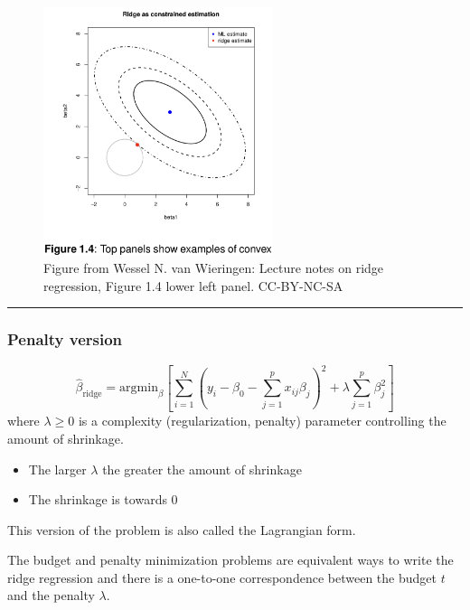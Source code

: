 \documentclass[
  letterpaper,
  DIV=11,
  numbers=noendperiod]{scrartcl}
\providecommand{\tightlist}{%
  \setlength{\itemsep}{0pt}\setlength{\parskip}{0pt}}\usepackage{longtable,booktabs,array}
\begin{document}
\begin{figure}

{\centering \includegraphics[width=0.6\textwidth,height=\textheight]{./WNvWFig14.jpg}

}

\caption{Figure from Wessel N. van Wieringen: Lecture notes on ridge
regression, Figure 1.4 lower left panel. CC-BY-NC-SA}

\end{figure}

\begin{center}\rule{0.5\linewidth}{0.5pt}\end{center}

\hypertarget{penalty-version}{%
\subsubsection{Penalty version}\label{penalty-version}}

\[ \hat{\beta}_{\text{ridge}}= \text{argmin}_{\beta}[\sum_{i=1}^N (y_i-\beta_0-\sum_{j=1}^p x_{ij}\beta_j )^2 + \lambda \sum_{j=1}^p \beta_j^2]\]
where \(\lambda \ge 0\) is a complexity (regularization, penalty)
parameter controlling the amount of shrinkage.

\begin{itemize}
\tightlist
\item
  The larger \(\lambda\) the greater the amount of shrinkage
\item
  The shrinkage is towards 0
\end{itemize}

This version of the problem is also called the Lagrangian form.

The budget and penalty minimization problems are equivalent ways to
write the ridge regression and there is a one-to-one correspondence
between the budget \(t\) and the penalty \(\lambda\).
\end{document}
